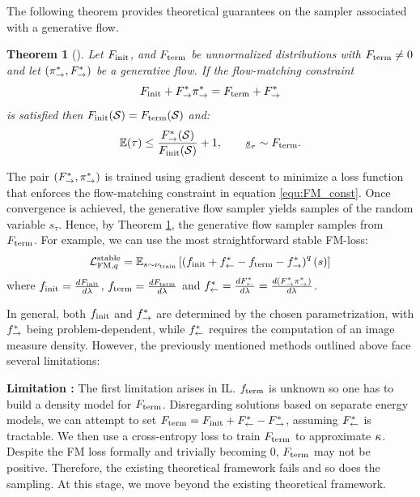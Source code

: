 \documentclass{article}
\theoremstyle{plain}
\newtheorem{theorem}{Theorem}[section]
\theoremstyle{definition}
\theoremstyle{remark}
\theoremstyle{fact}
\begin{document}
    
  The following theorem  provides theoretical guarantees on the sampler associated with a generative flow.

    \begin{theorem}
        [\cite{bengio2021flow, brunswic2024theory}] \label{theo:sampling_theorem} 
        Let $F_{\mathrm{init}}$, and $F_{\mathrm{term}}$ be unnormalized distributions with $F_{\mathrm{term}}\neq0$ and let $(\pi_{\rightarrow}^*, F^*_{\rightarrow})$ be a generative flow. If the flow-matching constraint 
        \begin{equation}
        \label{equ:FM_const}
            F_{\mathrm{init}} + F^*_{\rightarrow}\pi_{\rightarrow}^* = F_{\mathrm{term}} + F^*_{\rightarrow}
        \end{equation}
        is satisfied then $F_{\mathrm{init}}(\mathcal S)=F_{\mathrm{term}}(\mathcal S)$ and:
        \begin{equation}
            \mathbb E(\tau)\leq \frac{F^*_{\rightarrow}(\mathcal S)}{F_{\mathrm{init}}(\mathcal S)}+1,\quad \quad \underline s_\tau \sim F_{\mathrm{term}}. \nonumber
        \end{equation}
    
    \end{theorem}

    The pair $(F^*_{\rightarrow}, \pi_{\rightarrow}^*)$ is trained using gradient descent to minimize a loss function that enforces the flow-matching constraint in equation \eqref{equ:FM_const}. Once convergence is achieved, the generative flow sampler yields samples of the random variable $s_\tau$. Hence, by Theorem \ref{theo:sampling_theorem},  the generative flow sampler samples from $F_{\mathrm{term}}$. For example, we can use the most straightforward stable FM-loss:
    \begin{equation}\label{equ:FMloss}
        \mathcal L_{\mathrm{FM},q}^{\mathrm{stable}} = \mathbb E_{s\sim \nu_{\mathrm{train}}}\left[ \left(f_{\mathrm{init}} + f^*_{\leftarrow} - f_{\mathrm{term}} - f^*_{\rightarrow}\right)^q(s) \right]
    \end{equation}
    where $f_{\mathrm{init}} = \frac{dF_{\mathrm{init}}}{d\lambda}$, $f_{\mathrm{term}}=\frac{dF_{\mathrm{term}}}{d\lambda}$ and $f^*_{\leftarrow}=\frac{dF^*_{\leftarrow}}{d\lambda} = \frac{d(F^*_{\rightarrow}\pi_{\rightarrow}^*)}{d\lambda}$. 
    
    In general, both $f_{\mathrm{init}}$ and $f^*_{\rightarrow}$ are determined by the chosen parametrization, with $f^*_{\rightarrow}$ being problem-dependent, while $f^*_{\leftarrow}$ requires the computation of an image measure density. However, the previously mentioned methods outlined above face several limitations:

    \textbf{Limitation :} The first limitation arises in IL. $f_{\mathrm{term}}$ is unknown so one has to build a density model for $F_{\mathrm{term}}$. Disregarding solutions based on separate energy models, we can attempt to set $F_{\mathrm{term}}= F_{\mathrm{init}} + F^*_{\leftarrow} - F^*_{\rightarrow}$, assuming $F^*_{\leftarrow}$ is tractable.
    We then use a cross-entropy loss to train $F_{\mathrm{term}}$ to approximate $\kappa$. Despite the FM loss formally and trivially becoming 0, $F_{\mathrm{term}}$ may not be positive. Therefore, the existing theoretical framework fails and so does the sampling. At this stage, we move beyond the existing theoretical framework.
\end{document}
